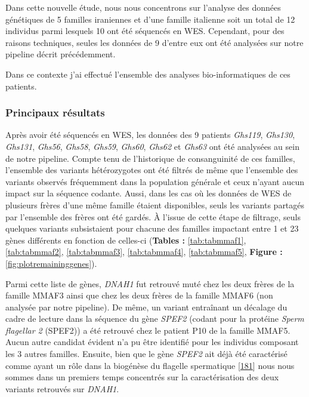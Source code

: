 \documentclass[12pt,a4paper,twoside]{ugathesis}
\theoremstyle{definition}
\theoremstyle{definition}
\theoremstyle{definition}
\theoremstyle{remark}
\begin{document}
Dans cette nouvelle étude, nous nous concentrons sur l'analyse des
données génétiques de 5 familles iraniennes et d'une famille italienne
soit un total de 12 individus parmi lesquels 10 ont été séquencés en
WES. Cependant, pour des raisons techniques, seules les données de 9
d'entre eux ont été analysées sur notre pipeline décrit précédemment.

Dans ce contexte j'ai effectué l'ensemble des analyses bio-informatiques
de ces patients.

\newpage



\newpage

\subsubsection{Principaux résultats}\label{principaux-resultats-2}

Après avoir été séquencés en WES, les données des 9 patients
\emph{Ghs119}, \emph{Ghs130}, \emph{Ghs131}, \emph{Ghs56}, \emph{Ghs58},
\emph{Ghs59}, \emph{Ghs60}, \emph{Ghs62} et \emph{Ghs63} ont été
analysées au sein de notre pipeline. Compte tenu de l'historique de
consanguinité de ces familles, l'ensemble des variants hétérozygotes ont
été filtrés de même que l'ensemble des variants observés fréquemment
dans la population générale et ceux n'ayant aucun impact sur la séquence
codante. Aussi, dans les cas où les données de WES de plusieurs frères
d'une même famille étaient disponibles, seuls les variants partagés par
l'ensemble des frères ont été gardés. À l'issue de cette étape de
filtrage, seuls quelques variants subsistaient pour chacune des familles
impactant entre 1 et 23 gènes différents en fonction de celles-ci
(\textbf{Tables :} \ref{tab:tabmmaf1}, \ref{tab:tabmmaf2},
\ref{tab:tabmmaf3}, \ref{tab:tabmmaf4}, \ref{tab:tabmmaf5},
\textbf{Figure : }\ref{fig:plotremaininggenes}).

Parmi cette liste de gènes, \emph{DNAH1} fut retrouvé muté chez les deux
frères de la famille MMAF3 ainsi que chez les deux frères de la famille
MMAF6 (non analysée par notre pipeline). De même, un variant entraînant
un décalage du cadre de lecture dans la séquence du gène \emph{SPEF2}
(codant pour la protéine \emph{Sperm flagellar 2} (SPEF2)) a été
retrouvé chez le patient P10 de la famille MMAF5. Aucun autre candidat
évident n'a pu être identifié pour les individus composant les 3 autres
familles. Ensuite, bien que le gène \emph{SPEF2} ait déjà été
caractérisé comme ayant un rôle dans la biogénèse du flagelle
spermatique {[}\protect\hyperlink{ref-Lehti2017}{181}{]} nous nous
sommes dans un premiers temps concentrés sur la caractérisation des deux
variants retrouvés sur \emph{DNAH1}.
\end{document}
